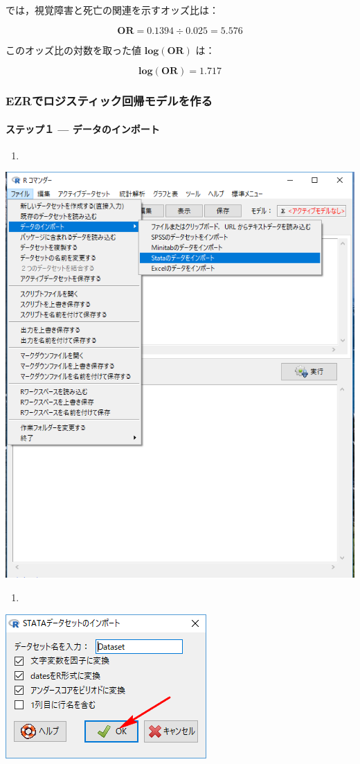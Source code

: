 \documentclass[11pt,]{problemset}
\let\oldparagraph\paragraph
\renewcommand{\paragraph}[1]{\oldparagraph{#1}\mbox{}}
\begin{document}
では，視覚障害と死亡の関連を示すオッズ比は：

\[
\mathbf{OR} = 0.1394 \div 0.025 = 5.576
\]

このオッズ比の対数を取った値 \(\mathbf{log(OR)}\) は：

\[
\mathbf{log(OR)} = 1.717
\]

\hypertarget{ezr}{%
\subsubsection{EZRでロジスティック回帰モデルを作る}\label{ezr}}

\hypertarget{-}{%
\paragraph{ステップ１ --- データのインポート}\label{-}}

\begin{enumerate}
\def\labelenumi{\arabic{enumi}.}
\item
\end{enumerate}

\begin{center}\includegraphics[width=0.5\linewidth]{pic/import00} \end{center}

\newpage
\vfill

\begin{enumerate}
\def\labelenumi{\arabic{enumi}.}
\setcounter{enumi}{1}
\item
\end{enumerate}

\begin{center}\includegraphics[width=0.3\linewidth]{pic/logstic01} \end{center}
\end{document}
